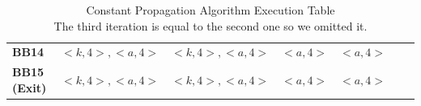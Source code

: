 \begin{table}[H]
{\begin{tabular}{lcccccc}
\textbf{BB14} & $<k, 4>, <a, 4>$ & $<k, 4>, <a, 4>$ & $<a, 4>$ & $<a, 4>$ \\
\textbf{BB15 (Exit)} & $<k, 4>, <a, 4>$ & $<k, 4>, <a, 4>$ & $<a, 4>$ & $<a, 4>$ \\
\bottomrule
\end{tabular}
}
\captionsetup{justification=centering} %
\caption{Constant Propagation Algorithm Execution Table\\[1.5ex] 
The third iteration is equal to the second one so we omitted it.}
\end{table}
